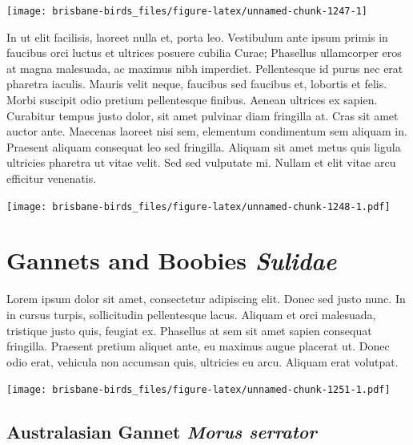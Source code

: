 \documentclass[]{book}
\let\origfigure\figure
\let\endorigfigure\endfigure
\renewenvironment{figure}[1][2] {
  \expandafter\origfigure\expandafter[H]
} {
  \endorigfigure
}
\begin{document}
\begin{figure}
\texttt{[image: brisbane-birds\_files/figure-latex/unnamed-chunk-1247-1]} \caption{insert figure caption}\label{fig:unnamed-chunk-1247}
\end{figure}

In ut elit facilisis, laoreet nulla et, porta leo. Vestibulum ante ipsum
primis in faucibus orci luctus et ultrices posuere cubilia Curae;
Phasellus ullamcorper eros at magna malesuada, ac maximus nibh
imperdiet. Pellentesque id purus nec erat pharetra iaculis. Mauris velit
neque, faucibus sed faucibus et, lobortis et felis. Morbi suscipit odio
pretium pellentesque finibus. Aenean ultrices ex sapien. Curabitur
tempus justo dolor, sit amet pulvinar diam fringilla at. Cras sit amet
auctor ante. Maecenas laoreet nisi sem, elementum condimentum sem
aliquam in. Praesent aliquam consequat leo sed fringilla. Aliquam sit
amet metus quis ligula ultricies pharetra ut vitae velit. Sed sed
vulputate mi. Nullam et elit vitae arcu efficitur venenatis.

\begin{figure}
\centering
\texttt{[image: brisbane-birds\_files/figure-latex/unnamed-chunk-1248-1.pdf]}
\caption{\label{fig:unnamed-chunk-1248}insert figure caption}
\end{figure}

\chapter{\texorpdfstring{Gannets and Boobies
\emph{Sulidae}}{Gannets and Boobies Sulidae}}\label{gannets-and-boobies-sulidae}

Lorem ipsum dolor sit amet, consectetur adipiscing elit. Donec sed justo
nunc. In in cursus turpis, sollicitudin pellentesque lacus. Aliquam et
orci malesuada, tristique justo quis, feugiat ex. Phasellus at sem sit
amet sapien consequat fringilla. Praesent pretium aliquet ante, eu
maximus augue placerat ut. Donec odio erat, vehicula non accumsan quis,
ultricies eu arcu. Aliquam erat volutpat.

\texttt{[image: brisbane-birds\_files/figure-latex/unnamed-chunk-1251-1.pdf]}

\section{\texorpdfstring{Australasian Gannet \emph{Morus
serrator}}{Australasian Gannet Morus serrator}}\label{australasian-gannet-morus-serrator}
\end{document}
